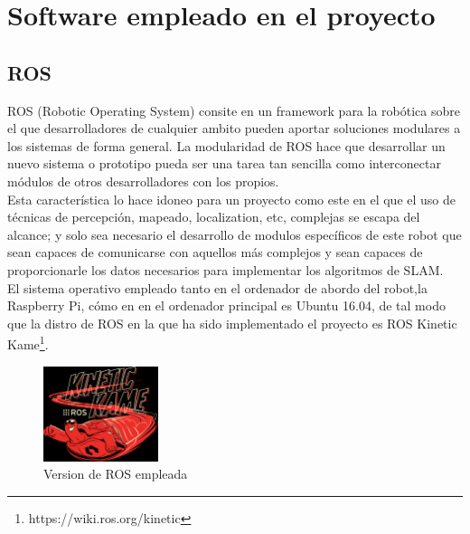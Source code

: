 \section{Software empleado en el proyecto}
\subsection{ROS}
ROS (Robotic Operating System) consite en un framework para la robótica sobre el que desarrolladores de cualquier 
ambito pueden aportar soluciones modulares a los sistemas de forma general. La modularidad de ROS hace que desarrollar 
un nuevo sistema o prototipo pueda ser una tarea tan sencilla como interconectar módulos de otros desarrolladores con 
los propios.\\
Esta característica lo hace idoneo para un proyecto como este en el que el uso de técnicas de percepción, 
mapeado, localization, etc, complejas se escapa del alcance; y solo sea necesario el desarrollo de modulos específicos de este robot
que sean capaces de comunicarse con aquellos más complejos y sean capaces de proporcionarle los datos necesarios para implementar los
algoritmos de SLAM. \\

El sistema operativo empleado tanto en el ordenador de abordo del robot,la Raspberry Pi, cómo en en el ordenador principal es Ubuntu 16.04, de tal modo que la distro de ROS en la que ha sido 
implementado el proyecto es ROS Kinetic Kame\footnote{https://wiki.ros.org/kinetic}.
\begin{figure}[!ht]
    \centering
    \includegraphics[width=0.3\textwidth]{images/kinetic.png}
    \caption{Version de ROS empleada}
\end{figure}

